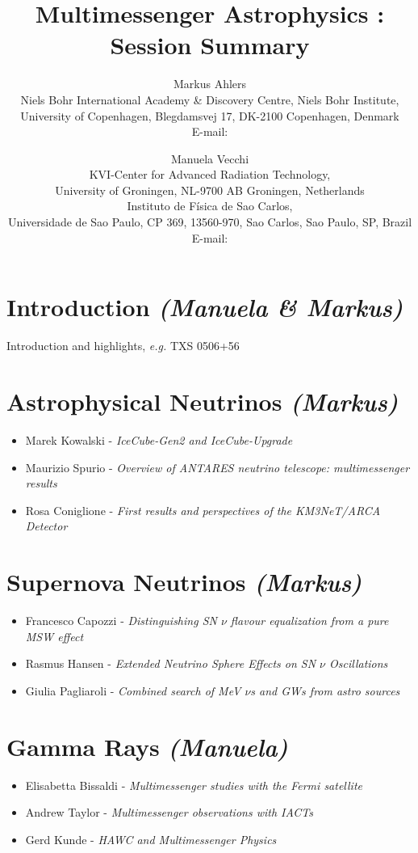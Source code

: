 \documentclass{PoS}
\title{Multimessenger Astrophysics : Session Summary}
\author{Markus Ahlers\\
        Niels Bohr International Academy \& Discovery Centre, Niels Bohr Institute,\\University of Copenhagen, Blegdamsvej 17, DK-2100 Copenhagen, Denmark\\
        E-mail: \email{markus.ahlers@nbi.ku.dk}}
\author{Manuela Vecchi\\
       KVI-Center for Advanced Radiation Technology,\\University of Groningen, NL-9700 AB Groningen, Netherlands\\Instituto de F\'isica de Sao Carlos,\\ Universidade de Sao Paulo, CP 369, 13560-970, Sao Carlos, Sao Paulo, SP, Brazil\\
        E-mail: \email{m.vecchi@rug.nl}}
\begin{document}
\section{Introduction {\it (Manuela \& Markus)}}

Introduction and highlights, {\it e.g.} TXS 0506+56~\cite{IceCube:2018cha,IceCube:2018dnn}

\section{Astrophysical Neutrinos {\it (Markus)}}

\begin{itemize}
\item Marek Kowalski - {\it IceCube-Gen2 and IceCube-Upgrade}~\cite{Aartsen:2014njl}
\item Maurizio Spurio - {\it Overview of ANTARES neutrino telescope: multimessenger results }
\item Rosa Coniglione - {\it First results and perspectives of the KM3NeT/ARCA Detector}~\cite{Adrian-Martinez:2016fdl}
\end{itemize}

\section{Supernova Neutrinos {\it (Markus)}}

\begin{itemize}
\item Francesco Capozzi - {\it Distinguishing SN $\nu$ flavour equalization from a pure MSW effect}
\item Rasmus Hansen - {\it Extended Neutrino Sphere Effects on SN $\nu$ Oscillations}
\item Giulia Pagliaroli - {\it Combined search of MeV $\nu$s and GWs from astro sources}
\end{itemize}

\section{Gamma Rays {\it (Manuela)}}

\begin{itemize}
\item Elisabetta Bissaldi - {\it Multimessenger studies with the Fermi satellite}
\item Andrew Taylor - {\it Multimessenger observations with IACTs}
\item Gerd Kunde - {\it HAWC and Multimessenger Physics}
\end{itemize}
\end{document}
